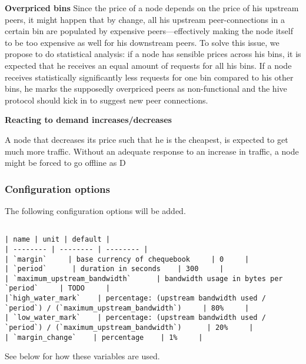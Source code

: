 \textbf{Overpriced bins}
Since the price of a node depends on the price of his upstream peers, it might happen that by change, all his upstream peer-connections in a certain bin are populated by expensive peers—effectively making the node itself to be too expensive as well for his downstream peers. To solve this issue, we propose to do statistical analysis: if a node has sensible prices across his bins, it is expected that he receives an equal amount of requests for all his bins. If a node receives statistically significantly less requests for one bin compared to his other bins, he marks the supposedly overpriced peers as non-functional and the hive protocol should kick in to suggest new peer connections. 

\textbf{Reacting to demand increases/decreases}

A node that decreases its price such that he is the cheapest, is expected to get much more traffic. Without an adequate response to an increase in traffic, a node might be forced to go offline as D

\subsubsection{Configuration options}
The following configuration options will be added. 

\begin{verbatim}

| name | unit | default |
| -------- | -------- | -------- |
| `margin`     | base currency of chequebook     | 0     |
| `period`      | duration in seconds    | 300     |
| `maximum_upstream_bandwidth`      | bandwidth usage in bytes per `period`     | TODO     |
|`high_water_mark`    | percentage: (upstream bandwidth used / `period`) / (`maximum_upstream_bandwidth`)     | 80%     |
| `low_water_mark`    | percentage: (upstream bandwidth used / `period`) / (`maximum_upstream_bandwidth`)      | 20%     |
| `margin_change`    | percentage    | 1%     |

\end{verbatim}

See below for how these variables are used.

